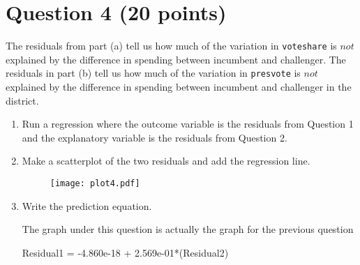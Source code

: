 \documentclass[12pt,letterpaper]{article}
\begin{document}
\section*{Question 4 (20 points)}
\noindent The residuals from part (a) tell us how much of the variation in \texttt{voteshare} is $not$ explained by the difference in spending between incumbent and challenger. The residuals in part (b) tell us how much of the variation in \texttt{presvote} is $not$ explained by the difference in spending between incumbent and challenger in the district.
	\begin{enumerate}
		\item Run a regression where the outcome variable is the residuals from Question 1 and the explanatory variable is the residuals from Question 2.	
		
			
		
		
		
		\item Make a scatterplot of the two residuals and add the regression line. 
			
		
			\begin{figure}[h!]\centering
			
			\texttt{[image: plot4.pdf]}
			
	    	\end{figure}
		
		\item Write the prediction equation.
		
	The graph under this question is actually the graph for the previous question
	
		Residual1 = -4.860e-18 + 2.569e-01*(Residual2)
		
	\end{enumerate}
	
	\newpage	
\end{document}
